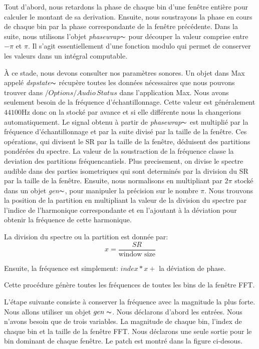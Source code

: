 Tout d'abord, nous retardons la phase de chaque bin d'une fenêtre entière pour calculer le montant de sa derivation. Ensuite, nous soustrayons la phase en cours de chaque bin par la phase correspondante de la fenêtre précédente. Dans la suite, nous utilisons l’objet \textit{phasewrap}$ \thicksim $ pour découper la valeur comprise entre $ - \pi $ et $ \pi $. Il s'agit essentiellement d'une fonction modulo qui permet de conserver les valeurs dans un intégral computable.

À ce stade, nous devons consulter nos paramètres sonores. Un objet dans Max appelé \textit{dspstate}$ \thicksim $ récupère toutes les données nécessaires que nous pouvons trouver dans $ / Options / Audio \, Status $ dans l'application Max. Nous avons seulement besoin de la fréquence d'échantillonnage. Cette valeur est généralement $ 44100 $Hz donc on la stocké par avance et si elle différente nous la changerions automatiquement. Le signal obtenu à partir de \textit{phasewrap}$ \thicksim $ est multiplié par la fréquence d'échantillonnage et par la suite divisé par la taille de la fenêtre. Ces opérations, qui divisent le SR par la taille de la fenêtre, déduisent des partitions pondérées du spectre. La valeur de la soustraction de la fréquence classe la deviation des partitions fréquencantiels. Plus precisement, on divise le spectre audible dans des parties isometriques qui sont determinés par la division du SR par la taille de la fenêtre. Ensuite, nous normalisons en multipliant par $ 2 \pi $ stocké dans un objet \textit{gen}$\thicksim $, pour manipuler la précision sur le nombre $\pi$. Nous trouvons la position de la partition en multipliant la valeur de la division du spectre par l'indice de l’harmonique correspondante et en l'ajoutant à la déviation pour obtenir la fréquence de cette harmonique.

La division du spectre ou la partition est donnée par:
    \begin{equation*}
        x = \frac{SR}{\text{window size}}
    \end{equation*}

Ensuite, la fréquence est simplement: $ index * x + $ la déviation de phase.

Cette procédure génère toutes les fréquences de toutes les bins de la fenêtre FFT.

L'étape suivante consiste à conserver la fréquence avec la magnitude la plus forte. Nous allons utiliser un objet $ gen \thicksim $. Nous déclarons d'abord les entrées. Nous n'avons besoin que de trois variables. La magnitude de chaque bin, l’index de chaque bin et la taille de la fenêtre FFT. Nous déclarons une seule sortie pour le bin dominant de chaque fenêtre. Le patch est montré dans la figure ci-desous.
        
